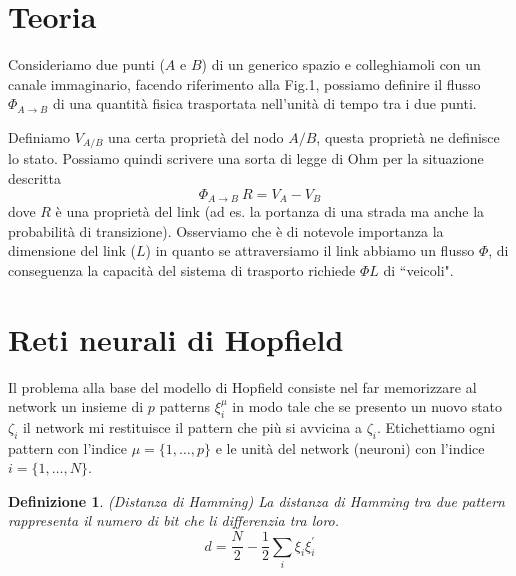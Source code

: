 \documentclass[12pt, a4paper]{book}
\theoremstyle{theorem}
\newtheorem{definition}{Definizione}[section]
\begin{document}
		\section{Teoria}
			Consideriamo due punti ($A$ e $B$) di un generico spazio e colleghiamoli con un canale immaginario, facendo riferimento alla Fig.1, possiamo definire il flusso $\Phi_{A \rightarrow B}$ di una quantità fisica trasportata nell'unità di tempo tra i due punti.
			\begin{figure}[ht!]
					\centering
					\caption{}
			\end{figure}
			Definiamo $V_{A/B}$ una certa proprietà del nodo $A/B$, questa proprietà ne definisce lo stato. Possiamo quindi scrivere una sorta di legge di Ohm per la situazione descritta 
			\begin{equation*}
					\Phi_{A \rightarrow B} \ R = V_A - V_B
			\end{equation*} dove $R$ è una proprietà del link (ad es. la portanza di una strada ma anche la probabilità di transizione).
			Osserviamo che è di notevole importanza la dimensione del link ($L$) in quanto se attraversiamo il link abbiamo un flusso $\Phi$, di conseguenza la capacità del sistema di trasporto richiede $\Phi L$ di “veicoli".			
			\begin{figure}[ht!]
					\centering
					\caption{}
			\end{figure}

		\section{Reti neurali di Hopfield}
			Il problema alla base del modello di Hopfield consiste nel far memorizzare al network un insieme di $p$ patterns $\xi_i^\mu$ in modo tale che se presento un nuovo stato $\zeta_i$ il network mi restituisce il pattern che più si avvicina a $\zeta_i$. Etichettiamo
			ogni pattern con l'indice $\mu = \{ 1, \dots, p\}$ e le unità del network (neuroni) con l'indice $i=\{1, \dots, N \}$.
			\begin{definition}(Distanza di Hamming)
			La distanza di Hamming tra due pattern rappresenta il numero di bit che li differenzia tra loro.
			\begin{equation*}
				d = \frac{N}{2} - \frac{1}{2} \sum_i \xi_i \xi_i^\prime
			\end{equation*}
			\end{definition}
\end{document}
